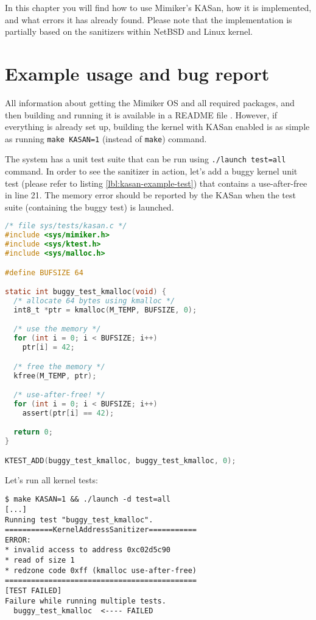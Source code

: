 \documentclass[shortabstract, manyadvisors, english, mgr]{iithesis}
\theoremstyle{definition} \newtheorem*{definition}{Definicja}
\theoremstyle{definition} \newtheorem*{example}{Przykład}
\theoremstyle{definition} \newtheorem*{remark}{Uwaga}
\begin{document}
In this chapter you will find how to use Mimiker's KASan, how it is implemented, and what errors it has already found. Please note that the implementation is partially based on the sanitizers within NetBSD and Linux kernel.

\section{Example usage and bug report}
All information about getting the Mimiker OS and all required packages, and then building and running it is available in a README file \cite{bib:mimiker-github}. However, if everything is already set up, building the kernel with KASan enabled is as simple as running \texttt{make~KASAN=1} (instead of \texttt{make}) command.

The system has a unit test suite that can be run using \texttt{./launch~test=all} command. In order to see the sanitizer in action, let's add a buggy kernel unit test (please refer to listing \ref{lbl:kasan-example-test}) that contains a use-after-free in line 21. The memory error should be reported by the KASan when the test suite (containing the buggy test) is launched.

\begin{lstlisting}[language=C, caption={Kernel unit test containing a use-after-free bug.}, label={lbl:kasan-example-test}]
/* file sys/tests/kasan.c */
#include <sys/mimiker.h>
#include <sys/ktest.h>
#include <sys/malloc.h>

#define BUFSIZE 64

static int buggy_test_kmalloc(void) {
  /* allocate 64 bytes using kmalloc */
  int8_t *ptr = kmalloc(M_TEMP, BUFSIZE, 0);

  /* use the memory */
  for (int i = 0; i < BUFSIZE; i++)
    ptr[i] = 42;

  /* free the memory */
  kfree(M_TEMP, ptr);

  /* use-after-free! */
  for (int i = 0; i < BUFSIZE; i++)
    assert(ptr[i] == 42);

  return 0;
}

KTEST_ADD(buggy_test_kmalloc, buggy_test_kmalloc, 0);
\end{lstlisting}
Let's run all kernel tests:
\begin{lstlisting}[caption=Example KASan report.]
$ make KASAN=1 && ./launch -d test=all
[...]
Running test "buggy_test_kmalloc".
===========KernelAddressSanitizer===========
ERROR:
* invalid access to address 0xc02d5c90
* read of size 1
* redzone code 0xff (kmalloc use-after-free)
============================================
[TEST FAILED]
Failure while running multiple tests.
  buggy_test_kmalloc  <---- FAILED
\end{lstlisting}
\end{document}
